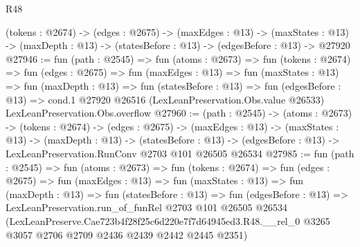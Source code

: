 \begin{lexlean}{R48}
\begin{coremodule}
  (tokens : @2674) ->
  (edges : @2675) ->
  (maxEdges : @13) ->
  (maxStates : @13) -> (maxDepth : @13) -> (statesBefore : @13) -> (edgesBefore : @13) -> @27920
@27946 := fun (path : @2545) =>
  fun (atoms : @2673) =>
  fun (tokens : @2674) =>
  fun (edges : @2675) =>
  fun (maxEdges : @13) =>
  fun (maxStates : @13) =>
  fun (maxDepth : @13) =>
  fun (statesBefore : @13) =>
  fun (edgesBefore : @13) =>
  cond.{1} @27920 @26516 (LexLeanPreservation.Obs.value @26533) LexLeanPreservation.Obs.overflow
@27960 := (path : @2545) ->
  (atoms : @2673) ->
  (tokens : @2674) ->
  (edges : @2675) ->
  (maxEdges : @13) ->
  (maxStates : @13) ->
  (maxDepth : @13) ->
  (statesBefore : @13) ->
  (edgesBefore : @13) -> LexLeanPreservation.RunConv @2703 @101 @26505 @26534
@27985 := fun (path : @2545) =>
  fun (atoms : @2673) =>
  fun (tokens : @2674) =>
  fun (edges : @2675) =>
  fun (maxEdges : @13) =>
  fun (maxStates : @13) =>
  fun (maxDepth : @13) =>
  fun (statesBefore : @13) =>
  fun (edgesBefore : @13) =>
  LexLeanPreservation.run_of_funRel
    @2703
    @101
    @26505
    @26534
    (LexLeanPreserve.Cae723b4f28f25c6d220e7f7d64945ed3.R48.__rel_0
      @3265
      @3057
      @2706
      @2709
      @2436
      @2439
      @2442
      @2445
      @2351)
\end{coremodule}
\end{lexlean}

